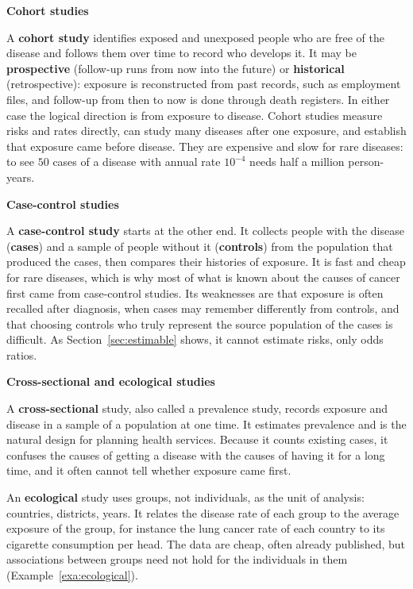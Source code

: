 \documentclass[11pt,a4paper]{article}
\numberwithin{equation}{section}
\theoremstyle{definition}
\newcommand{\subhead}[1]{%
  \par\medskip\noindent\textbf{#1}\par\nobreak\smallskip}
\begin{document}
\subhead{Cohort studies}

A \textbf{cohort study} identifies exposed and unexposed people who are free of the disease and follows them over time to record who
develops it. It may be \textbf{prospective} (follow-up runs from now into the future) or \textbf{historical} (retrospective): exposure is
reconstructed from past records, such as employment files, and follow-up from then to now is done through death registers. In either case
the logical direction is from exposure to disease. Cohort studies measure risks and rates directly, can study many diseases after one
exposure, and establish that exposure came before disease. They are expensive and slow for rare diseases: to see $50$ cases of a disease with
annual rate $10^{-4}$ needs half a million person-years.

\subhead{Case-control studies}

A \textbf{case-control study} starts at the other end. It collects people with the disease (\textbf{cases}) and a sample of people without
it (\textbf{controls}) from the population that produced the cases, then compares their histories of exposure. It is fast and cheap for rare
diseases, which is why most of what is known about the causes of cancer first came from case-control studies. Its weaknesses are that
exposure is often recalled after diagnosis, when cases may remember differently from controls, and that choosing controls who truly
represent the source population of the cases is difficult. As Section~\ref{sec:estimable} shows, it cannot estimate risks, only odds ratios.

\subhead{Cross-sectional and ecological studies}

A \textbf{cross-sectional} study, also called a prevalence study, records exposure and disease in a sample of a population at one time. It
estimates prevalence and is the natural design for planning health services. Because it counts existing cases, it confuses the causes
of getting a disease with the causes of having it for a long time, and it often cannot tell whether exposure came first.

An \textbf{ecological} study uses groups, not individuals, as the unit of analysis: countries, districts, years. It relates the disease
rate of each group to the average exposure of the group, for instance the lung cancer rate of each country to its cigarette consumption per
head. The data are cheap, often already published, but associations between groups need not hold for the individuals in them
(Example~\ref{exa:ecological}).
\end{document}
